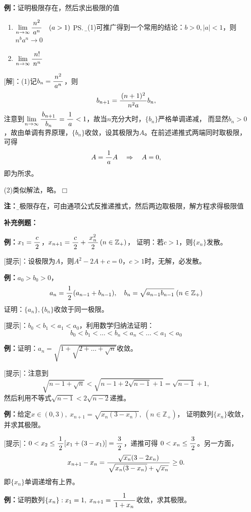 {\bf 例：}证明极限存在，然后求出极限的值
\begin{enumerate}[(1)]
  \setlength{\itemindent}{1cm}
  \item $\lim\limits_{n\to\infty}\displaystyle\frac{\,{n^2}\,}{\,{a^n}\,}\quad (a>1)$%
  \ps{\b 由(1)可推广得到一个常用的结论：$b>0,|a|<1$，则$n^ba^n\to 0$}
  \item $\lim\limits_{n\to\infty}\displaystyle\frac{\,{n!}\,}{\,{n^n}\,}$%
\end{enumerate}

[解]：(1)\;记$b_n=\displaystyle\frac{\,{n^2}\,}{\,{a^n}\,}$，则
$$b_{n+1}=\displaystyle\frac{\,{(n+1)^2}\,}{\,{n^2a}\,}b_n,$$
注意到$\lim\limits_{n\to\infty}\displaystyle\frac{\,{b_{n+1}}\,}{\,{b_n}\,}=\displaystyle\frac{\,{1}\,}{\,{a}\,}<1$，故当$n$充分大时，$\{b_n\}$严格单调递减，
而显然$b_n>0$，故由单调有界原理，$\{b_n\}$收敛，设其极限为$A$。在前述递推式两端同时取极限，
可得
$$A=\displaystyle\frac{\,{1}\,}{\,{a}\,}A\quad\Rightarrow\quad A=0,$$
即为所求。

(2)\;类似解法，略。\hfill $\Box$

{\bf 注：}{\b 若极限存在，可由通项公式反推递推式，然后两边取极限，解方程求得极限值}

{\bf 补充例题：}

{\bf 例：}$x_1=\displaystyle\frac{\,{c}\,}{\,{2}\,}$，$x_{n+1}=\displaystyle\frac{\,{c}\,}{\,{2}\,}+\displaystyle\frac{\,{x_n^2}\,}{\,{2}\,}\,(n\in\mathbb{Z}_+)$，
证明：若$c>1$，则$\{x_n\}$发散。

[提示]：设极限为$A$，则$A^2-2A+c=0$，$c>1$时，无解，必发散。

{\bf 例：}$a_0>b_0>0$，
$$a_n=\displaystyle\frac{\,{1}\,}{\,{2}\,}(a_{n-1}+b_{n-1}),\quad
b_n=\sqrt{a_{n-1}b_{n-1}}\;(n\in\mathbb{Z}_+)$$
证明：$\{a_n\},\{b_n\}$收敛于同一极限。

[提示]：$b_0<b_1<a_1<a_0$，利用数学归纳法证明：
$$b_0<b_1<\ldots<b_n<a_n<\ldots<a_1<a_0$$

{\bf 例：}证明：$a_n=\sqrt{1+\sqrt{2+\ldots+\sqrt{n}}}$收敛。

[提示]：注意到
$$\sqrt{n-1+\sqrt n}<\sqrt{n-1+2\sqrt{n-1}+1}=\sqrt{n-1}+1,$$
然后利用不等式$\sqrt{n-1}<2\sqrt{n-2}$递推。

{\bf 例：}给定$x\in(0,3),\; x_{n+1}=\sqrt{x_n(3-x_n)},\;(n\in\mathbb{Z}_+)$，
证明数列$\{x_n\}$收敛，并求其极限。

[提示]：$0<x_2\leq\displaystyle\frac{\,{1}\,}{\,{2}\,}[x_1+(3-x_1)]=\displaystyle\frac{\,{3}\,}{\,{2}\,}$，递推可得
$0<x_n\leq\displaystyle\frac{\,{3}\,}{\,{2}\,}$。另一方面，
$$x_{n+1}-x_n=\displaystyle\frac{\,{\sqrt{x_n}(3-2x_n)}\,}{\,{\sqrt{x_n(3-x_n)}+\sqrt{x_n}}\,}\geq 0.$$
即$\{x_n\}$单调递增有上界。

{\bf 例：}证明数列$\{x_n\}:x_1=1,\;x_{n+1}=\displaystyle\frac{\,{1}\,}{\,{1+x_n}\,}$收敛，求其极限。

